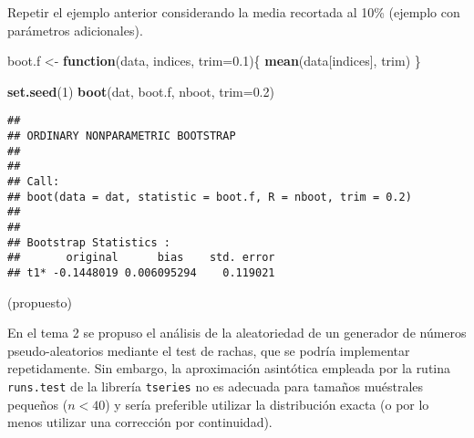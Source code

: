 \documentclass[
]{book}
\newenvironment{Shaded}{\begin{snugshade}}{\end{snugshade}}
\newcommand{\ControlFlowTok}[1]{\textcolor[rgb]{0.13,0.29,0.53}{\textbf{#1}}}
\newcommand{\DataTypeTok}[1]{\textcolor[rgb]{0.13,0.29,0.53}{#1}}
\newcommand{\DecValTok}[1]{\textcolor[rgb]{0.00,0.00,0.81}{#1}}
\newcommand{\FloatTok}[1]{\textcolor[rgb]{0.00,0.00,0.81}{#1}}
\newcommand{\KeywordTok}[1]{\textcolor[rgb]{0.13,0.29,0.53}{\textbf{#1}}}
\newcommand{\NormalTok}[1]{#1}
\newcommand{\StringTok}[1]{\textcolor[rgb]{0.31,0.60,0.02}{#1}}
\theoremstyle{break}
\theoremstyle{definition}
\theoremstyle{definition}
\theoremstyle{definition}
\theoremstyle{remark}
\let\BeginKnitrBlock\begin \let\EndKnitrBlock\end
\begin{document}
\BeginKnitrBlock{exercise}
\protect\hypertarget{exr:unnamed-chunk-68}{}{\label{exr:unnamed-chunk-68} }
\EndKnitrBlock{exercise}

Repetir el ejemplo anterior considerando la media recortada al 10\%
(ejemplo con parámetros adicionales).

\begin{Shaded}
\begin{Highlighting}[]
\NormalTok{boot.f <-}\StringTok{ }\ControlFlowTok{function}\NormalTok{(data, indices, }\DataTypeTok{trim=}\FloatTok{0.1}\NormalTok{)\{}
  \KeywordTok{mean}\NormalTok{(data[indices], trim)}
\NormalTok{\}}

\KeywordTok{set.seed}\NormalTok{(}\DecValTok{1}\NormalTok{)}
\KeywordTok{boot}\NormalTok{(dat, boot.f, nboot, }\DataTypeTok{trim=}\FloatTok{0.2}\NormalTok{)}
\end{Highlighting}
\end{Shaded}

\begin{verbatim}
## 
## ORDINARY NONPARAMETRIC BOOTSTRAP
## 
## 
## Call:
## boot(data = dat, statistic = boot.f, R = nboot, trim = 0.2)
## 
## 
## Bootstrap Statistics :
##       original      bias    std. error
## t1* -0.1448019 0.006095294    0.119021
\end{verbatim}

\vspace{0.5cm}

\BeginKnitrBlock{exercise}
\protect\hypertarget{exr:unnamed-chunk-70}{}{\label{exr:unnamed-chunk-70} }(propuesto)
\EndKnitrBlock{exercise}

En el tema 2 se propuso el análisis de la aleatoriedad de un
generador de números pseudo-aleatorios mediante el test de rachas,
que se podría implementar repetidamente. Sin embargo, la
aproximación asintótica empleada por la rutina \texttt{runs.test} de la
librería \texttt{tseries} no es adecuada para tamaños muéstrales pequeños
(\(n<40\)) y sería preferible utilizar la distribución exacta (o
por lo menos utilizar una corrección por continuidad).
\end{document}
